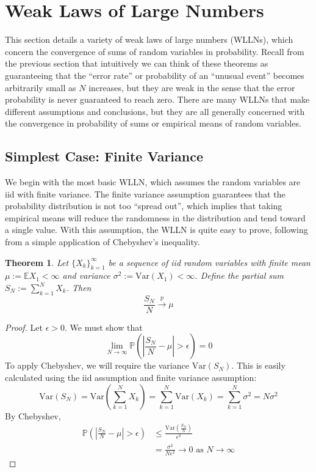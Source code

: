 \documentclass[12pt]{article}
\newcommand*{\abs}[1]{\left\lvert#1\right\rvert}
\newcommand{\E}{\mathbb{E}}
\newcommand{\Var}{\mathrm{Var}}
\newcommand{\Prob}{\mathbb{P}}
\newtheorem{thm}{Theorem}
\begin{document}
\section{Weak Laws of Large Numbers}
This section details a variety of weak laws of large numbers (WLLNs), which concern the convergence of sums of random variables in probability. Recall from the previous section that intuitively we can think 
of these theorems as guaranteeing that the ``error rate'' or probability of an ``unusual event'' becomes arbitrarily small as $N$ increases, but they are weak in the sense that the error probability is never guaranteed 
to reach zero. There are many WLLNs that make different assumptions and conclusions, but they are all generally concerned with the convergence in probability of sums or empirical means of random variables. 

\subsection{Simplest Case: Finite Variance}
We begin with the most basic WLLN, which assumes the random variables are iid with finite variance. The finite variance assumption guarantees that the probability distribution is not too ``spread out'', which implies 
that taking empirical means will reduce the randomness in the distribution and tend toward a single value. With this assumption, the WLLN is quite easy to prove, following from a simple application of Chebyshev's 
inequality. 
\begin{thm} 
Let $\{X_k\}_{k = 1}^{\infty}$ be a sequence of iid random variables with finite mean $\mu := \E X_1 < \infty$ and variance $\sigma^2 := \Var(X_1) < \infty$. Define the partial sum $S_N := \sum_{k = 1}^{N} X_k$. Then 
\[\frac{S_N}{N} \overset{p}{\to} \mu\]
\end{thm}

\begin{proof}
Let $\epsilon > 0$. We must show that 
\[\lim_{N \to \infty} \Prob\left(\abs{\frac{S_N}{N} - \mu} > \epsilon \right) = 0\]
To apply Chebyshev, we will require the variance $\Var(S_N)$. This is easily calculated using the iid assumption and finite variance assumption:
\[\Var(S_N) = \Var\left(\sum_{k = 1}^{N} X_k \right) = \sum_{k = 1}^{N} \Var(X_k) =  \sum_{k = 1}^{N} \sigma^2 = N\sigma^2 \]
By Chebyshev, 
\begin{align*}
\Prob\left(\abs{\frac{S_N}{N} - \mu} > \epsilon \right) &\leq \frac{\Var\left(\frac{S_N}{N}\right)}{\epsilon^2} \\
									       &= \frac{\sigma^2}{N\epsilon^2} \to 0 \text{ as } N \to \infty 
\end{align*}
\end{proof}
\end{document}
